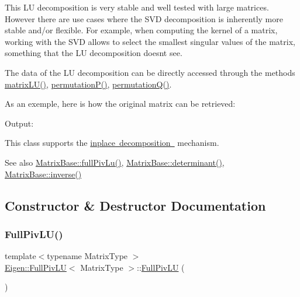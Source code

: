 This LU decomposition is very stable and well tested with large matrices. However there are use cases where the S\+VD decomposition is inherently more stable and/or flexible. For example, when computing the kernel of a matrix, working with the S\+VD allows to select the smallest singular values of the matrix, something that the LU decomposition doesn\textquotesingle{}t see.

The data of the LU decomposition can be directly accessed through the methods \mbox{\hyperlink{class_eigen_1_1_full_piv_l_u_afea0b8fc707a9097d46fe358cb18bbff}{matrix\+L\+U()}}, \mbox{\hyperlink{class_eigen_1_1_full_piv_l_u_a09274c82240f6441af5e6c99e24e756d}{permutation\+P()}}, \mbox{\hyperlink{class_eigen_1_1_full_piv_l_u_a8d18190c7618de271cba7293f0493a36}{permutation\+Q()}}.

As an exemple, here is how the original matrix can be retrieved\+: 
\begin{DoxyCodeInclude}{0}
\end{DoxyCodeInclude}
 Output\+: 
\begin{DoxyVerbInclude}
\end{DoxyVerbInclude}


This class supports the \mbox{\hyperlink{}{inplace decomposition }} mechanism.

\begin{DoxySeeAlso}{See also}
\mbox{\hyperlink{class_eigen_1_1_matrix_base_a25da97d31acab0ee5d9d13bdbb0569da}{Matrix\+Base\+::full\+Piv\+Lu()}}, \mbox{\hyperlink{class_eigen_1_1_matrix_base_a7ad8f77004bb956b603bb43fd2e3c061}{Matrix\+Base\+::determinant()}}, \mbox{\hyperlink{class_eigen_1_1_matrix_base_a7712eb69e8ea3c8f7b8da1c44dbdeebf}{Matrix\+Base\+::inverse()}} 
\end{DoxySeeAlso}


\subsection{Constructor \& Destructor Documentation}
\mbox{\label{class_eigen_1_1_full_piv_l_u_af225528d1c6e623a2b1dce091907d13e}} 
\subsubsection{\texorpdfstring{FullPivLU()}{FullPivLU()}\hspace{0.1cm}{\footnotesize\ttfamily [1/4]}}
{\footnotesize\ttfamily template$<$typename Matrix\+Type $>$ \\
\mbox{\hyperlink{class_eigen_1_1_full_piv_l_u}{Eigen\+::\+Full\+Piv\+LU}}$<$ Matrix\+Type $>$\+::\mbox{\hyperlink{class_eigen_1_1_full_piv_l_u}{Full\+Piv\+LU}} (\begin{DoxyParamCaption}{ }\end{DoxyParamCaption})}



